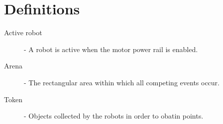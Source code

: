 \section {Definitions}

\begin {description}
\item [Active robot] - A robot is active when the motor power rail is enabled.
\item [Arena] - The rectangular area within which all competing events occur.
\item [Token] - Objects collected by the robots in order to obatin points.
\end {description}
